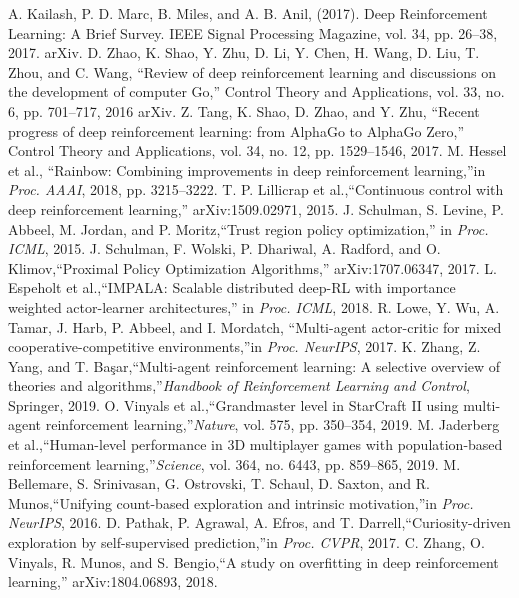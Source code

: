 \documentclass[conference]{IEEEtran}
\begin{document}
\begin{thebibliography}{00}
      A. Kailash, P. D. Marc, B. Miles, and A. B. Anil, (2017). Deep Reinforcement Learning: A Brief Survey. IEEE Signal Processing Magazine, vol. 34, pp. 26–38, 2017. arXiv.
     D. Zhao,  K. Shao, Y. Zhu, D. Li, Y. Chen, H. Wang, D. Liu, T. Zhou, and C. Wang, “Review of deep reinforcement learning and discussions on the development of computer Go,” Control Theory and Applications, vol. 33, no. 6, pp. 701–717, 2016 arXiv.
     Z. Tang, K. Shao, D. Zhao, and Y. Zhu, “Recent progress of deep reinforcement learning: from AlphaGo to AlphaGo Zero,” Control Theory and Applications, vol. 34, no. 12, pp. 1529–1546, 2017.
     M. Hessel et al., “Rainbow: Combining improvements in deep reinforcement learning,”in \textit{Proc. AAAI}, 2018, pp. 3215–3222.
     T. P. Lillicrap et al.,“Continuous control with deep reinforcement learning,” arXiv:1509.02971, 2015.
     J. Schulman, S. Levine, P. Abbeel, M. Jordan, and P. Moritz,“Trust region policy optimization,” in \textit{Proc. ICML}, 2015.
     J. Schulman, F. Wolski, P. Dhariwal, A. Radford, and O. Klimov,“Proximal Policy Optimization Algorithms,” arXiv:1707.06347, 2017.
     L. Espeholt et al.,“IMPALA: Scalable distributed deep-RL with importance weighted actor-learner architectures,” in \textit{Proc. ICML}, 2018.
     R. Lowe, Y. Wu, A. Tamar, J. Harb, P. Abbeel, and I. Mordatch, “Multi-agent actor-critic for mixed cooperative-competitive environments,”in \textit{Proc. NeurIPS}, 2017.
     K. Zhang, Z. Yang, and T. Başar,“Multi-agent reinforcement learning: A selective overview of theories and algorithms,”\textit{Handbook of Reinforcement Learning and Control}, Springer, 2019.
     O. Vinyals et al.,“Grandmaster level in StarCraft II using multi-agent reinforcement learning,”\textit{Nature}, vol. 575, pp. 350–354, 2019.
     M. Jaderberg et al.,“Human-level performance in 3D multiplayer games with population-based reinforcement learning,”\textit{Science}, vol. 364, no. 6443, pp. 859–865, 2019.
     M. Bellemare, S. Srinivasan, G. Ostrovski, T. Schaul, D. Saxton, and R. Munos,“Unifying count-based exploration and intrinsic motivation,”in \textit{Proc. NeurIPS}, 2016.
     D. Pathak, P. Agrawal, A. Efros, and T. Darrell,“Curiosity-driven exploration by self-supervised prediction,”in \textit{Proc. CVPR}, 2017.
     C. Zhang, O. Vinyals, R. Munos, and S. Bengio,“A study on overfitting in deep reinforcement learning,” arXiv:1804.06893, 2018.

\end{thebibliography}
\end{document}
